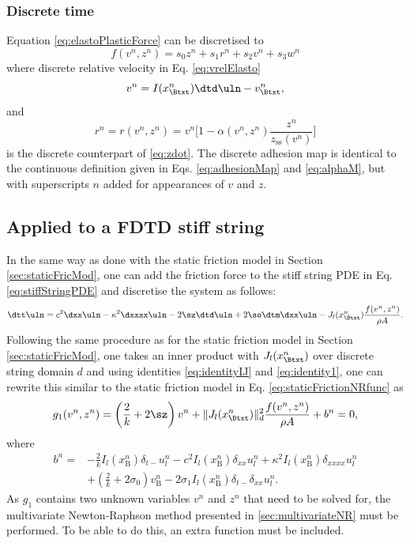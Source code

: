 \subsubsection{Discrete time}
Equation \eqref{eq:elastoPlasticForce} can be discretised to
\begin{equation}\label{eq:discForceFunction}
    f(v^n,z^n) = s_0z^n + s_1r^n+s_2v^n+s_3w^n
\end{equation} 
where discrete relative velocity in Eq. \eqref{eq:vrelElasto}
\begin{equation}\label{eq:vrelElastoDisc}
    v^n = I(x_\Btxt^n)\dtd\uln - v_\Btxt^n,
\end{equation}
and 
\begin{equation}\label{eq:r}
    r^n = r(v^n,z^n) = v^n\bigg[1-\alpha(v^n,z^n)\frac{z^n}{z_\text{ss}(v^n)}\bigg]
\end{equation}
is the discrete counterpart of \eqref{eq:zdot}. The discrete adhesion map is identical to the continuous definition given in Eqs. \eqref{eq:adhesionMap} and \eqref{eq:alphaM}, but with superscripts $n$ added for appearances of $v$ and $z$.

\subsection{Applied to a FDTD stiff string}

In the same way as done with the static friction model in Section \ref{sec:staticFricMod}, one can add the friction force to the stiff string PDE in Eq. \eqref{eq:stiffStringPDE} and discretise the system as follows:
%
\begin{equation}\label{eq:elastoStiffStringFDS}
    \dtt \uln = c^2 \dxx \uln - \kappa^2 \dxxxx \uln - 2 \sz \dtd \uln + 2 \so\dtm\dxx \uln - J_l(x_\Btxt^n)\frac{f(v^n,z^n)}{\rho A}.
\end{equation}
Following the same procedure as for the static friction model in Section \ref{sec:staticFricMod}, one takes an inner product with $J_l(x_\Btxt^n)$ over discrete string domain $d$ and using identities \eqref{eq:identityIJ} and \eqref{eq:identity1}, one can rewrite this similar to the static friction model in Eq. \eqref{eq:staticFrictionNRfunc} as
%
\begin{equation}
    g_1(v^n,z^n) = \left(\frac{2}{k} + 2\sz\right)v^n + \lVert J_l(x_\Btxt^n)\rVert_d^2\frac{f(v^n,z^n)}{\rho A}+ b^n= 0,
\end{equation}
where
\begin{align*}
    b^n =&-\frac{2}{k}I_l(x_\text{B}^n)\delta_{t-}u_l^n - c^2 I_l(x_\text{B}^n)\delta_{xx} u_l^n +\kappa^2I_l(x_\text{B}^n)\delta_{xxxx} u_l^n\\
    &+\left(\frac{2}{k}+ 2\sigma_0\right)v_\text{B}^n-2\sigma_1I_l(x_\text{B}^n)\delta_{t-}\delta_{xx}u_l^n.
\end{align*}
As $g_1$ contains two unknown variables $v^n$ and $z^n$ that need to be solved for, the multivariate Newton-Raphson method presented in \ref{sec:multivariateNR} must be performed. To be able to do this, an extra function must be included. 

